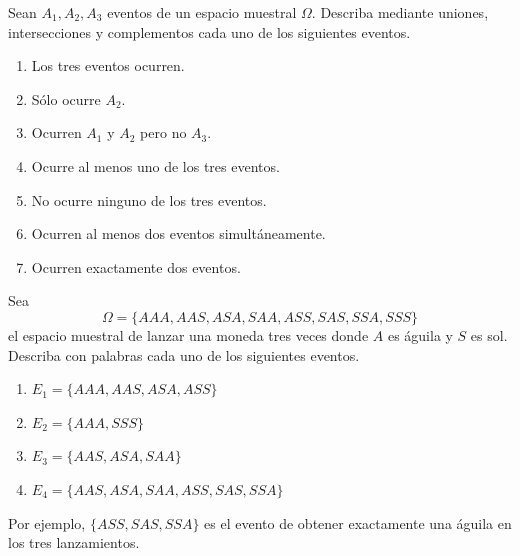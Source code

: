 \documentclass[12pt,a4paper]{article}
\begin{document}
    \begin{mdframed}[style=mdbluebox,frametitle={Ejercicio 4}]
        Sean $A_1, A_2, A_3$ eventos de un espacio muestral $\Omega$. Describa mediante uniones, intersecciones y complementos cada uno de los siguientes eventos.
        \begin{enumerate}[label=(\alph*)]
            \item Los tres eventos ocurren.
            \item Sólo ocurre $A_2$.
            \item Ocurren $A_1$ y $A_2$ pero no $A_3$.
            \item Ocurre al menos uno de los tres eventos.
            \item No ocurre ninguno de los tres eventos.
            \item Ocurren al menos dos eventos simultáneamente.
            \item Ocurren exactamente dos eventos.
        \end{enumerate}
    \end{mdframed}

    \begin{mdframed}[style=mdbluebox,frametitle={Ejercicio 5}]
        Sea
        \begin{equation*}
            \Omega = \{AAA, AAS, ASA, SAA, ASS, SAS, SSA, SSS\}
        \end{equation*}
        el espacio muestral de lanzar una moneda tres veces donde $A$ es águila y $S$ es sol. Describa con palabras cada uno de los siguientes eventos.
        \begin{enumerate}[label=(\alph*)]
            \item $E_1 = \{AAA, AAS, ASA, ASS\}$
            \item $E_2 = \{AAA, SSS\}$
            \item $E_3 = \{AAS, ASA, SAA\}$
            \item $E_4 = \{AAS, ASA, SAA, ASS, SAS, SSA\}$
        \end{enumerate}
        Por ejemplo, $\{ASS, SAS, SSA\}$ es el evento de obtener exactamente una águila en los tres lanzamientos.
    \end{mdframed}
\end{document}

